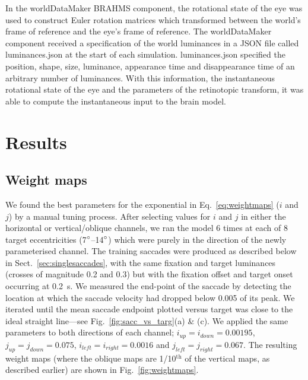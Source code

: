 \documentclass{frontiersSCNS}
\begin{document}
In the worldDataMaker BRAHMS component, the rotational state of the
eye was used to construct Euler rotation matrices which transformed
between the world's frame of reference and the eye's frame of
reference. The worldDataMaker component received a specification of
the world luminances in a JSON file called luminances.json at the
start of each simulation. luminances.json specified the position,
shape, size, luminance, appearance time and disappearance time of an
arbitrary number of luminances. With this information, the
instantaneous rotational state of the eye and the parameters of the
retinotopic transform, it was able to compute the instantaneous input
to the brain model.


\section{Results}

%

\subsection{Weight maps}

We found the best parameters for the exponential in Eq.~\ref{eq:weightmaps} 
($i$ and $j$) by a manual tuning process. After selecting values for $i$ and $j$ 
in either the horizontal or vertical/oblique channels, we ran the model 6 times 
at each of 8 target eccentricities (7$\degree$--14$\degree$) which were purely
in the direction of the
newly parameterised channel. The training saccades were produced as described below in
Sect.~\ref{sec:singlesaccades}, with the same fixation and target luminances
(crosses of magnitude 0.2 and 0.3) but with
the fixation offset and target onset occurring at 0.2~s. We measured the end-point
of the saccade by
detecting the location at which the saccade velocity had dropped below 
0.005 of its peak. We iterated until the mean saccade endpoint plotted versus target
was close to the ideal straight line---see Fig.~\ref{fig:sacc_vs_targ}(a) \& (c). We
applied the same parameters to both directions of each channel; 
$i_{up} = i_{down} = 0.00195$, $j_{up} = j_{down} = 0.075$, 
$i_{left} = i_{right} = 0.0016$ and $j_{left} = j_{right} = 0.067$. The resulting
weight maps (where the oblique maps are 1/10$^{\mathrm{th}}$ of the vertical maps,
as described earlier) are shown in Fig.~\ref{fig:weightmaps}.
\end{document}
